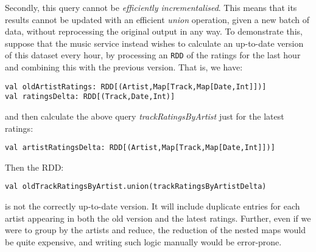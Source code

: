 {Secondly, this query cannot be \textit{efficiently incrementalised}. This means that its results cannot be updated with an efficient \textit{union} operation, given a new batch of data, without reprocessing the original output in any way. To demonstrate this, suppose that the music service instead wishes to calculate an up-to-date version of this dataset every hour, by processing an \lstinline{RDD} of the ratings for the last hour and combining this with the previous version. That is, we have:
\vs\begin{lstlisting}
val oldArtistRatings: RDD[(Artist,Map[Track,Map[Date,Int]])]
val ratingsDelta: RDD[(Track,Date,Int)]
\end{lstlisting}\vs
and then calculate the above query \textit{trackRatingsByArtist} just for the latest ratings:
\vs\begin{lstlisting}
val artistRatingsDelta: RDD[(Artist,Map[Track,Map[Date,Int]])]
\end{lstlisting}\vs
Then the RDD:
\vs\begin{lstlisting}
val oldTrackRatingsByArtist.union(trackRatingsByArtistDelta)
\end{lstlisting}\vs
is not the correctly up-to-date version. It will include duplicate entries for each artist appearing in both the old version and the latest ratings. Further, even if we were to group by the artists and reduce, the reduction
of the nested maps would be quite expensive, and writing such logic manually would be error-prone. 
}


